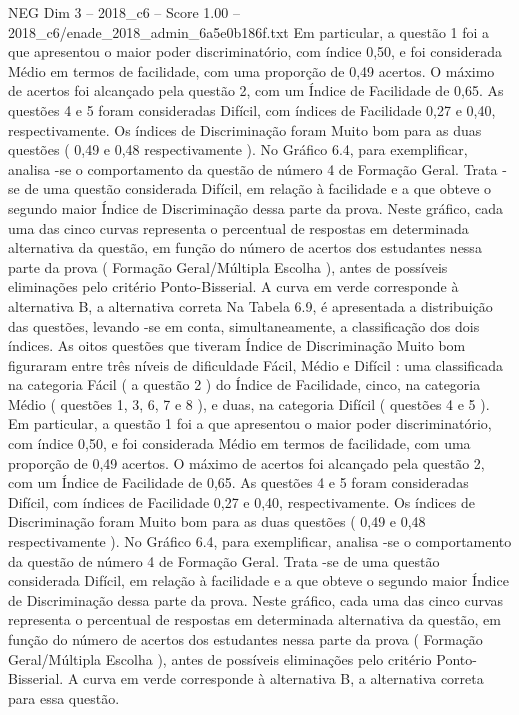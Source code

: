 \begin{textsample}{NEG Dim 3 – 2018\_c6 – Score 1.00 – 2018\_c6/enade\_2018\_admin\_6a5e0b186f.txt}
Em particular, a questão 1 foi a que apresentou o maior poder discriminatório, com índice 0,50, e foi considerada Médio em termos de facilidade, com uma proporção de 0,49 acertos.
O máximo de acertos foi alcançado pela questão 2, com um Índice de Facilidade de 0,65.
As questões 4 e 5 foram consideradas Difícil, com índices de Facilidade 0,27 e 0,40, respectivamente.
Os índices de Discriminação foram Muito bom para as duas questões ( 0,49 e 0,48 respectivamente ).
No Gráfico 6.4, para exemplificar, analisa -se o comportamento da questão de número 4 de Formação Geral.
Trata -se de uma questão considerada Difícil, em relação à facilidade e a que obteve o segundo maior Índice de Discriminação dessa parte da prova.
Neste gráfico, cada uma das cinco curvas representa o percentual de respostas em determinada alternativa da questão, em função do número de acertos dos estudantes nessa parte da prova ( Formação Geral/Múltipla Escolha ), antes de possíveis eliminações pelo critério Ponto-Bisserial.
A curva em verde corresponde à alternativa B, a alternativa correta Na Tabela 6.9, é apresentada a distribuição das questões, levando -se em conta, simultaneamente, a classificação dos dois índices.
As oitos questões que tiveram Índice de Discriminação Muito bom figuraram entre três níveis de dificuldade Fácil, Médio e Difícil : uma classificada na categoria Fácil ( a questão 2 ) do Índice de Facilidade, cinco, na categoria Médio ( questões 1, 3, 6, 7 e 8 ), e duas, na categoria Difícil ( questões 4 e 5 ).
Em particular, a questão 1 foi a que apresentou o maior poder discriminatório, com índice 0,50, e foi considerada Médio em termos de facilidade, com uma proporção de 0,49 acertos.
O máximo de acertos foi alcançado pela questão 2, com um Índice de Facilidade de 0,65.
As questões 4 e 5 foram consideradas Difícil, com índices de Facilidade 0,27 e 0,40, respectivamente.
Os índices de Discriminação foram Muito bom para as duas questões ( 0,49 e 0,48 respectivamente ).
No Gráfico 6.4, para exemplificar, analisa -se o comportamento da questão de número 4 de Formação Geral.
Trata -se de uma questão considerada Difícil, em relação à facilidade e a que obteve o segundo maior Índice de Discriminação dessa parte da prova.
Neste gráfico, cada uma das cinco curvas representa o percentual de respostas em determinada alternativa da questão, em função do número de acertos dos estudantes nessa parte da prova ( Formação Geral/Múltipla Escolha ), antes de possíveis eliminações pelo critério Ponto-Bisserial.
A curva em verde corresponde à alternativa B, a alternativa correta para essa questão.

\end{textsample}
